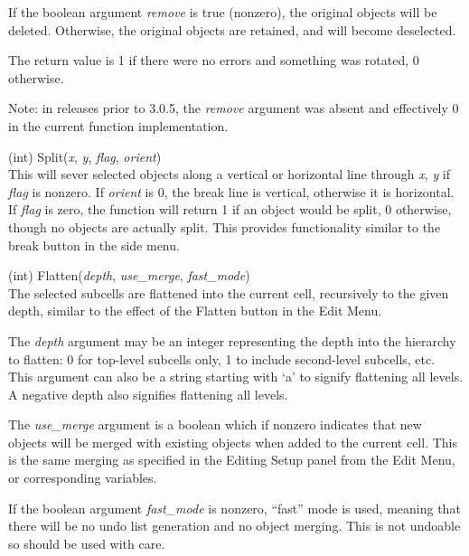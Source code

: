 \begin{description}
If the boolean argument {\it remove} is true (nonzero), the original
objects will be deleted.  Otherwise, the original objects are
retained, and will become deselected.

The return value is 1 if there were no errors and something was
rotated, 0 otherwise.

Note:  in releases prior to 3.0.5, the {\it remove} argument was 
absent and effectively 0 in the current function implementation.

\item{(int) \vt Split({\it x\/}, {\it y\/}, {\it flag\/}, {\it orient\/})}\\
This will sever selected objects along a vertical or horizontal line
through {\it x\/}, {\it y\/} if {\it flag\/} is nonzero.  If {\it orient\/}
is 0, the break line is vertical, otherwise it is horizontal.  If {\it
flag\/} is zero, the function will return 1 if an object would be split,
0 otherwise, though no objects are actually split.  This provides
functionality similar to the {\cb break\/} button in the side menu.

\item{(int) \vt Flatten({\it depth\/}, {\it use\_merge\/},
  {\it fast\_mode\/})}\\
The selected subcells are flattened into the current cell, recursively
to the given depth, similar to the effect of the {\cb Flatten} button
in the {\cb Edit Menu}.

The {\it depth} argument may be an integer representing the depth into
the hierarchy to flatten:  0 for top-level subcells only, 1 to include
second-level subcells, etc.  This argument can also be a string
starting with `{\vt a}' to signify flattening all levels.  A negative
depth also signifies flattening all levels.

The {\it use\_merge} argument is a boolean which if nonzero indicates
that new objects will be merged with existing objects when added to
the current cell.  This is the same merging as specified in the {\cb
Editing Setup} panel from the {\cb Edit Menu}, or corresponding
variables.

If the boolean argument {\it fast\_mode} is nonzero, ``fast'' mode is used,
meaning that there will be no undo list generation and no object
merging.  This is not undoable so should be used with care.


\end{description}
